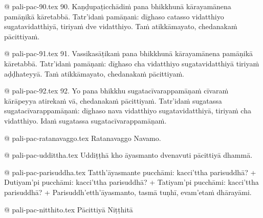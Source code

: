 @ pali-pac-90.tex
90. Kaṇḍupaṭicchādiṁ pana bhikkhunā kārayamānena pamāṇikā kāretabbā. Tatr’idaṁ pamāṇaṁ: dīghaso catasso vidatthiyo sugatavidatthiyā, tiriyaṁ dve vidatthiyo. Taṁ atikkāmayato, chedanakaṁ pācittiyaṁ.

@ pali-pac-91.tex
91. Vassikasāṭikaṁ pana bhikkhunā kārayamānena pamāṇikā kāretabbā. Tatr’idaṁ pamāṇaṁ: dīghaso cha vidatthiyo sugatavidatthiyā tiriyaṁ aḍḍhateyyā. Taṁ atikkāmayato, chedanakaṁ pācittiyaṁ.

@ pali-pac-92.tex
92. Yo pana bhikkhu sugatacīvarappamāṇaṁ cīvaraṁ kārāpeyya atirekaṁ vā, chedanakaṁ pācittiyaṁ. Tatr’idaṁ sugatassa sugatacīvarappamāṇaṁ: dīghaso nava vidatthiyo sugatavidatthiyā, tiriyaṁ cha vidatthiyo. Idaṁ sugatassa sugatacīvarappamāṇaṁ.

@ pali-pac-ratanavaggo.tex
Ratanavaggo Navamo.

@ pali-pac-uddittha.tex
Uddiṭṭhā kho āyasmanto dvenavuti pācittiyā dhammā.

@ pali-pac-parisuddha.tex
Tatth’āyasmante pucchāmi: kacci’ttha parisuddhā? +
Dutiyam’pi pucchāmi: kacci’ttha parisuddhā? +
Tatiyam’pi pucchāmi: kacci’ttha parisuddhā? +
Parisuddh’etth’āyasmanto, tasmā tuṇhī, evam’etaṁ dhārayāmi.

@ pali-pac-nitthito.tex
Pācittiyā Niṭṭhitā
